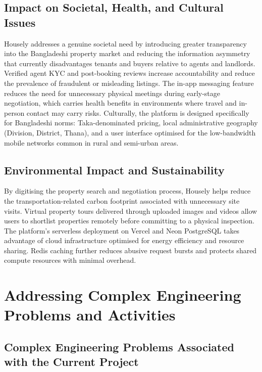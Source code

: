 \documentclass[12pt,a4paper]{report}
\begin{document}
\section{Impact on Societal, Health, and Cultural Issues}

Housely addresses a genuine societal need by introducing greater transparency into the
Bangladeshi property market and reducing the information asymmetry that currently
disadvantages tenants and buyers relative to agents and landlords. Verified agent KYC
and post-booking reviews increase accountability and reduce the prevalence of fraudulent
or misleading listings. The in-app messaging feature reduces the need for unnecessary
physical meetings during early-stage negotiation, which carries health benefits in
environments where travel and in-person contact may carry risks. Culturally, the platform
is designed specifically for Bangladeshi norms: Taka-denominated pricing, local
administrative geography (Division, District, Thana), and a user interface optimised for
the low-bandwidth mobile networks common in rural and semi-urban areas.

\section{Environmental Impact and Sustainability}

By digitising the property search and negotiation process, Housely helps reduce the
transportation-related carbon footprint associated with unnecessary site visits. Virtual
property tours delivered through uploaded images and videos allow users to shortlist
properties remotely before committing to a physical inspection. The platform's serverless
deployment on Vercel and Neon PostgreSQL takes advantage of cloud infrastructure
optimised for energy efficiency and resource sharing. Redis caching further reduces
abusive request bursts and protects shared compute resources with minimal overhead.

\chapter{Addressing Complex Engineering Problems and Activities}
\label{chap:complex}

\section{Complex Engineering Problems Associated with the Current Project}
\end{document}
